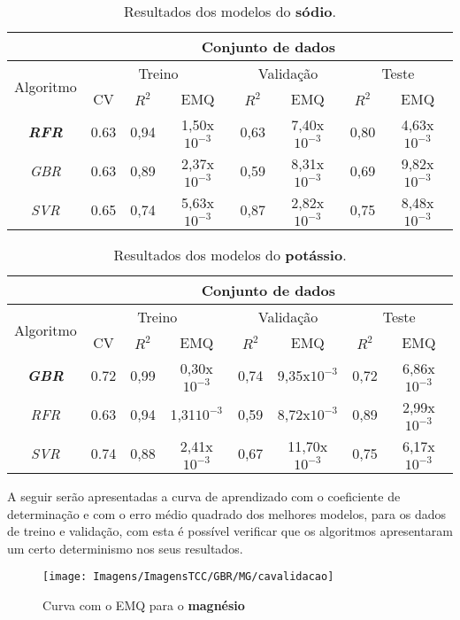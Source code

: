 \documentclass[
12pt,				%
oneside,			%
a4paper,			%
english,			%
french,				%
spanish,			%
brazil				%
]{abntex2}
\begin{document}
\begin{table}[H]
	\centering
	\caption{Resultados dos modelos do \textbf{sódio}.}
	\begin{tabular}{c|c|c|c|c|c|c|c}
		&\multicolumn{7}{c}{Conjunto de dados}\\\hline
		\multirow{2}{*}{Algoritmo} & \multicolumn{3}{c}{Treino} & \multicolumn{2}{c}{Validação}& \multicolumn{2}{c}{Teste}\\\cline{2-8}
		&CV& $R^2$ & EMQ & $R^2$ & EMQ & $R^2$ & EMQ\\\hline
		\textit{\textbf{RFR}}&0.63&0,94&1,50x$10^{-3}$&0,63&7,40x$10^{-3}$&0,80&4,63x$10^{-3}$\\
		\textit{GBR}&0.63&0,89&2,37x$10^{-3}$&0,59&8,31x$10^{-3}$&0,69&9,82x$10^{-3}$\\
		\textit{SVR}&0.65&0,74&5,63x$10^{-3}$&0,87&2,82x$10^{-3}$&0,75&8,48x$10^{-3}$\\
	\end{tabular}	
	\label{tab:ressodio}
\end{table}

\begin{table}[H]
	\centering
	\caption{Resultados dos modelos do \textbf{potássio}.}
	\begin{tabular}{c|c|c|c|c|c|c|c}
		&\multicolumn{7}{c}{Conjunto de dados}\\\hline
		\multirow{2}{*}{Algoritmo} & \multicolumn{3}{c}{Treino} & \multicolumn{2}{c}{Validação}& \multicolumn{2}{c}{Teste}\\\cline{2-8}
		&CV& $R^2$ & EMQ & $R^2$ & EMQ & $R^2$ & EMQ\\\hline
		\textit{\textbf{GBR}}&0.72&0,99&0,30x$10^{-3}$&0,74&9,35x$10^{-3}$&0,72&6,86x$10^{-3}$\\
		\textit{RFR}&0.63&0,94&1,31$10^{-3}$&0,59&8,72x$10^{-3}$&0,89&2,99x$10^{-3}$\\
		\textit{SVR}&0.74&0,88&2,41x$10^{-3}$&0,67&11,70x$10^{-3}$&0,75&6,17x$10^{-3}$\\
	\end{tabular}	
	\label{tab:respotassio}
\end{table}


A seguir serão apresentadas a curva de aprendizado  com o coeficiente de determinação e com o erro médio quadrado dos melhores modelos, para os dados de treino e validação, com esta é possível verificar que os algoritmos apresentaram um certo determinismo nos seus resultados.

\begin{figure}[H]
	\caption{Curva com o EMQ para o \textbf{magnésio}}
	\centering %
	\texttt{[image: Imagens/ImagensTCC/GBR/MG/cavalidacao]} %
	\label{fig:gmagcaval}
\end{figure}
\end{document}
